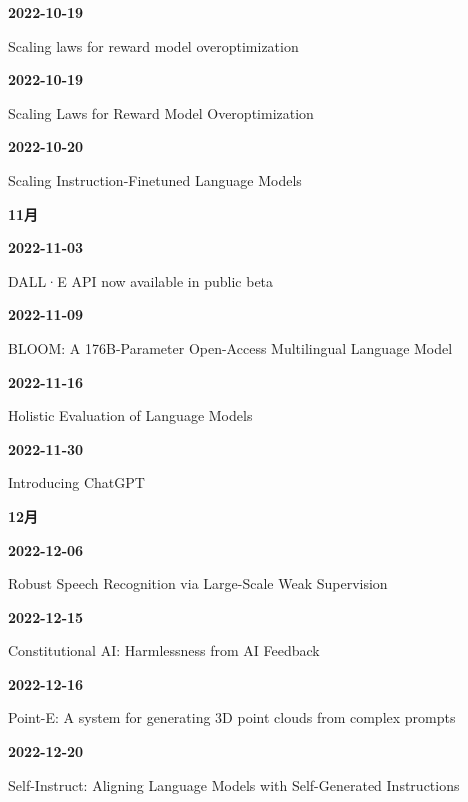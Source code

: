 \smallskip
\noindent\textbf{2022-10-19}\par
{\raggedright Scaling laws for reward model overoptimization\par}
\smallskip
\noindent\textbf{2022-10-19}\par
{\raggedright Scaling Laws for Reward Model Overoptimization\par}
\smallskip
\noindent\textbf{2022-10-20}\par
{\raggedright Scaling Instruction-Finetuned Language Models\par}
\smallskip
\medskip
\noindent\textbf{11月}\par
\smallskip
\noindent\textbf{2022-11-03}\par
{\raggedright DALL·E API now available in public beta\par}
\smallskip
\noindent\textbf{2022-11-09}\par
{\raggedright BLOOM: A 176B-Parameter Open-Access Multilingual Language Model\par}
\smallskip
\noindent\textbf{2022-11-16}\par
{\raggedright Holistic Evaluation of Language Models\par}
\smallskip
\noindent\textbf{2022-11-30}\par
{\raggedright Introducing ChatGPT\par}
\smallskip
\medskip
\noindent\textbf{12月}\par
\smallskip
\noindent\textbf{2022-12-06}\par
{\raggedright Robust Speech Recognition via Large-Scale Weak Supervision\par}
\smallskip
\noindent\textbf{2022-12-15}\par
{\raggedright Constitutional AI: Harmlessness from AI Feedback\par}
\smallskip
\noindent\textbf{2022-12-16}\par
{\raggedright Point-E: A system for generating 3D point clouds from complex prompts\par}
\smallskip
\noindent\textbf{2022-12-20}\par
{\raggedright Self-Instruct: Aligning Language Models with Self-Generated Instructions\par}
\smallskip
